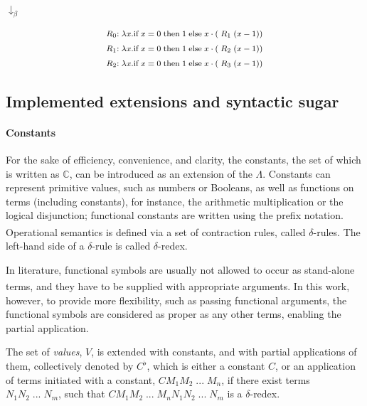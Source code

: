 \documentclass[table, a4paper, 10pt]{book}
\newcommand{\cit}[1]{\textsuperscript{\cite{#1}}}
\begin{document}
$\downarrow_\beta$

\begin{align*}
\text{\footnotesize$R_0{:}\; \lambda x. \text{if}\;x = 0\;\text{then}\;1\;\text{else}\;x\cdot (\;R_1\;(x - 1))$}\\
\text{\footnotesize$R_1{:}\; \lambda x. \text{if}\;x = 0\;\text{then}\;1\;\text{else}\;x\cdot (\;R_2\;(x - 1))$}\\
\text{\footnotesize$R_2{:}\; \lambda x. \text{if}\;x = 0\;\text{then}\;1\;\text{else}\;x\cdot (\;R_3\;(x - 1))$}
\end{align*}


\subsection{Implemented extensions and syntactic sugar}\label{sec:extensions}
\paragraph{Constants}
For the sake of efficiency, convenience, and clarity, the constants, the set
of which is written as $\mathbb{C}$, can be introduced as
an extension of the $\Lambda$. Constants can represent primitive values,
such as numbers or Booleans, as well as functions on terms (including constants), for instance,
the arithmetic multiplication or the logical disjunction; functional constants
are written using the prefix notation. Operational semantics
is defined via a set of contraction rules, called $\delta$-rules.\cit{baren94}
The left-hand side of a $\delta$-rule is called $\delta$-redex.

In literature, functional symbols are usually not allowed to occur
as stand-alone terms, and they have to be supplied with appropriate arguments.\cit{pierce}
In this work, however, to provide more flexibility, such as
passing functional arguments, the functional symbols are
considered as proper as any other terms, enabling the partial application.

The set of \textit{values}, $V$, is extended with constants, and with partial applications
of them, collectively denoted by $C^\flat$, which is either a constant $C$, or an application of terms initiated
with a constant, $C M_1 M_2\;...\;M_n$, if there exist terms $N_1 N_2\;...\;N_m$, such that
$C M_1 M_2\;...\;M_n N_1 N_2\;...\;N_m$ is a $\delta$-redex.
\end{document}
